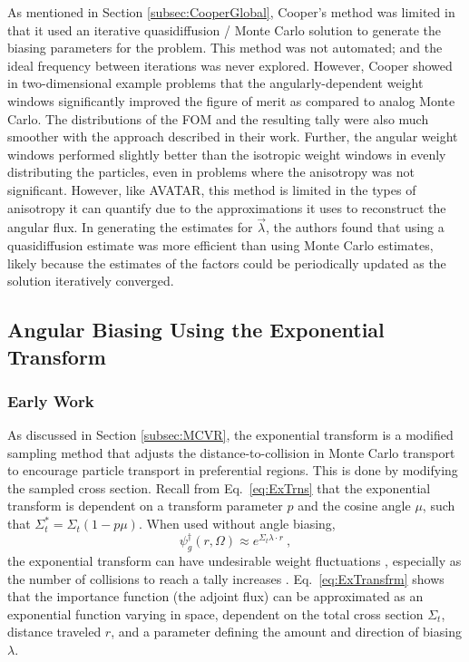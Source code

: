 As mentioned in Section \ref{subsec:CooperGlobal}, Cooper's method was limited in that it used an
iterative quasidiffusion / Monte Carlo solution to generate the biasing parameters for
the problem. This method was not automated; and the ideal frequency between iterations
was never explored. However, Cooper showed in two-dimensional example problems
that the angularly-dependent weight windows
significantly improved the figure of merit as compared to analog Monte Carlo.
The distributions of the FOM and the resulting tally were also much smoother
with the approach described in their work.
Further, the
angular weight windows performed slightly better than the isotropic weight windows in
evenly distributing the particles, even in problems where the anisotropy was not
significant. However, like
AVATAR, this method is limited in the types of anisotropy it can quantify due to
the approximations it uses to reconstruct the angular flux. In generating the
estimates for $\vec{\lambda}$, the authors found that using a quasidiffusion
estimate was more efficient than using Monte Carlo estimates, likely because the
estimates of the factors could be periodically updated as the solution
iteratively converged.
%
%

\subsection{Angular Biasing Using the Exponential Transform}

\subsubsection{Early Work}

As discussed in Section \ref{subsec:MCVR}, the exponential transform is a modified
sampling method that adjusts the distance-to-collision in Monte Carlo
transport to encourage particle transport in preferential regions. This is done
by modifying the sampled cross section.
Recall from Eq.\ \eqref{eq:ExTrns} that
the exponential transform is dependent on a transform parameter $p$ and the
cosine angle $\mu$, such that $\Sigma_t^* = \Sigma_t(1-p\mu)$.
When used without angle biasing,
\begin{equation}
  \psi^{\dagger}_g (r, \Omega) \approx e^{\Sigma_t \lambda \cdot r}\:,
  \label{eq:ExTransfrm}
\end{equation}
the exponential transform can
have undesirable weight
fluctuations \cite{haghighat_monte_2003}, especially as the number of collisions
to reach a tally increases \cite{gupta_sampling_1985}. Eq.\
\eqref{eq:ExTransfrm} shows that the importance function (the adjoint flux) can
be approximated as an exponential function varying in space, dependent on the
total cross section $\Sigma_t$, distance traveled $r$, and a parameter defining the amount
and direction of biasing $\lambda$.


